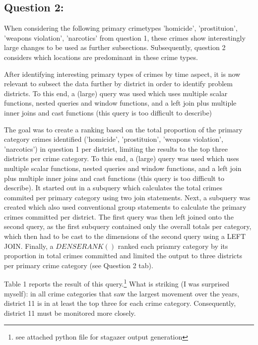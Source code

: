 \documentclass[a4paper]{article}
\begin{document}
\subsection{Question 2:}


When considering the following primary crimetypes 'homicide', 'prostituion', 'weapons violation', 'narcotics' from question 1, these crimes show interestingly large changes to be used as further subsections. Subsequently, question 2 considers which locations are predominant in these crime types. 

After identifying interesting primary types of crimes by time aspect, it is now relevant to subsect the data further by district in order to identify problem districts. To this end, a (large) query was used which uses multiple scalar functions, nested queries and window functions, and a left join plus multiple inner joins and cast functions (this query is too difficult to describe)

The goal was to create a ranking based on the total proportion of the primary category crimes identified ('homicide', 'prostituion', 'weapons violation', 'narcotics') in question 1 per district, limiting the results to the top three districts per crime category. To this end, a (large) query was used which uses multiple scalar functions, nested queries and window functions, and a left join plus multiple inner joins and cast functions (this query is too difficult to describe). It started out in a subquery which calculates the total crimes commited per primary category using two join statements. Next, a subquery was created which also used conventional group statements to calculate the primary crimes committed per district. The first query was then left joined onto the second query, as the first subquery contained only the overall totals per category, which then had to be cast to the dimensions of the second query using a LEFT JOIN. Finally, a $DENSE RANK()$ ranked each priamry category by its proportion in total crimes committed and limited the output to three districts per primary crime category (see Question 2 tab).

Table 1 reports the result of this query.\footnote{see attached python file for stagazer output generation} What is striking (I was surprised myself): in all crime categories that saw the largest movement over the years, district 11 is in at least the top three for each crime category. Consequently, district 11 must be monitored more closely. 
\end{document}
